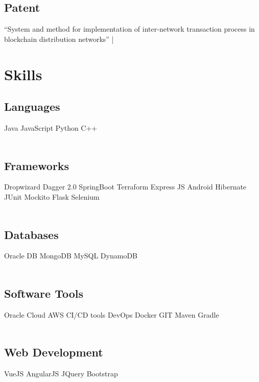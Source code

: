 \documentclass[]{resume-openfont}
\begin{document}
\begin{minipage}[t]{0.33\textwidth}
\subsection{Patent}
“System and method for implementation of inter-network transaction process in blockchain distribution networks”  | \href{https://patentscope.wipo.int/search/en/detail.jsf?docId=IN326376132}{\faLink}



\section{Skills}
\subsection{Languages}
Java \textbullet{}   JavaScript \textbullet{} Python \textbullet{} C++ \\~\\
\subsection{Frameworks}
Dropwizard \textbullet{} Dagger 2.0 \textbullet{} SpringBoot \textbullet{} Terraform \textbullet{} Express JS \textbullet{} Android \textbullet{} Hibernate \textbullet{} JUnit \textbullet{} Mockito \textbullet{} Flask \textbullet{} Selenium \\~\\
\subsection{Databases}
Oracle DB \textbullet{} MongoDB \textbullet{} MySQL \textbullet{} DynamoDB \\~\\
\subsection{Software Tools}
Oracle Cloud \textbullet{} AWS \textbullet{} CI/CD tools \textbullet{} DevOps \textbullet{} Docker \textbullet{} GIT \textbullet{} Maven \textbullet{} Gradle \\~\\
\subsection{Web Development}
VueJS \textbullet{}  AngularJS \textbullet{} JQuery \textbullet{} Bootstrap \\~\\

%
%

\end{minipage}
\end{document}
